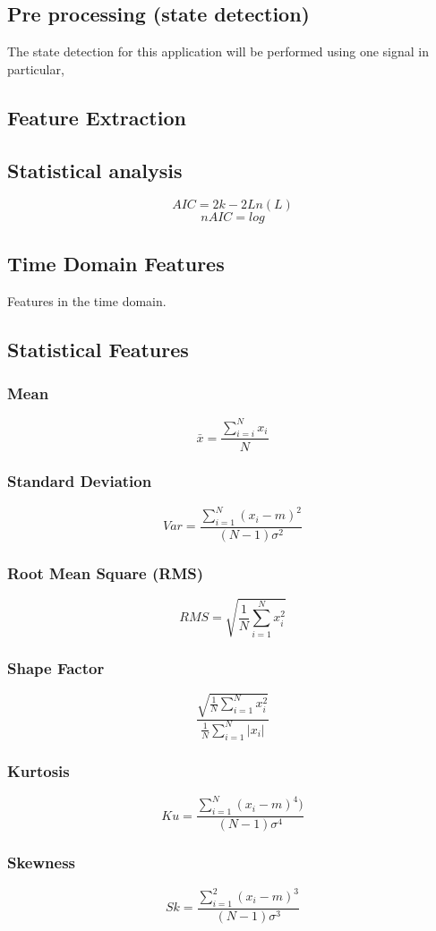 \documentclass{article}
\begin{document}
\subsection{Pre processing (state detection)}
The state detection for this application will be performed using one signal in particular, 

\subsection{Feature Extraction}


\subsection{Statistical analysis}
$$ AIC = 2k - 2Ln(L) $$  
$$ nAIC = log $$
 
\subsection{Time Domain Features} 	
Features in the time domain.
\subsection{Statistical Features}
\subsubsection{Mean}
$$ \bar{x} = \frac{\sum^N_{i=i} x_i}{N} $$
\subsubsection{Standard Deviation}  
$$ Var =\frac{\sum^N_{i=1}(x_i-m)^2}{(N-1)\sigma^2} $$
\subsubsection{Root Mean Square (RMS)}
$$ RMS = \sqrt{\frac{1}{N} \sum^N_{i=1}x^2_i} $$
\subsubsection{Shape Factor}
$$ \frac{ \sqrt{\frac{1}{N} \sum^N_{i=1}x_i^2} }  {\frac{1}{N}\sum^N_{i=1}|x_i|} $$
\subsubsection{Kurtosis} 
$$ Ku = \frac{\sum^N_{i=1}(x_i-m)^4)}{(N-1)\sigma^4} $$ 
\subsubsection{Skewness} 
$$ Sk = \frac{\sum^2_{i=1}(x_i-m)^3}{(N-1)\sigma^3} $$
  
\end{document}
